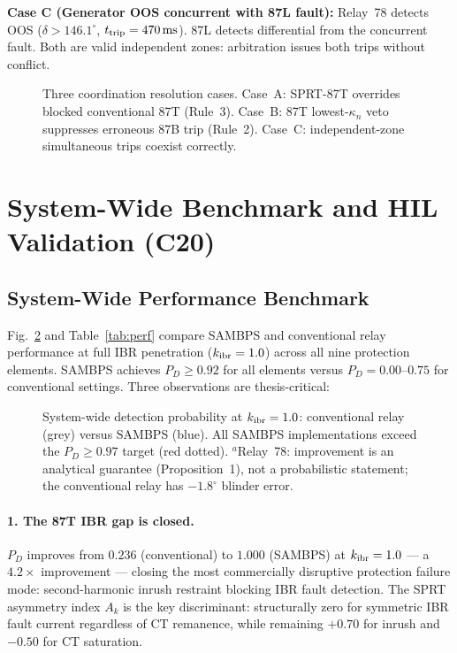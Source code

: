 \documentclass[journal,twoside]{IEEEtran}
\begin{document}
\textbf{Case C (Generator OOS concurrent with 87L fault):}
Relay~78 detects OOS ($\delta > 146.1^\circ$, $t_{\rm trip} = 470\,\text{ms}$).
87L detects differential from the concurrent fault.
Both are valid independent zones: arbitration issues both trips without conflict.

\begin{figure}[t]
  \centering
  \resizebox{\columnwidth}{!}{}
  \caption{Three coordination resolution cases. Case~A: SPRT-87T overrides
    blocked conventional 87T (Rule~3). Case~B: 87T lowest-$\kappa_n$ veto
    suppresses erroneous 87B trip (Rule~2). Case~C: independent-zone
    simultaneous trips coexist correctly.}
  \label{fig:coord_cases}
\end{figure}

\section{System-Wide Benchmark and HIL Validation (C20)}
\label{sec:bench}

\subsection{System-Wide Performance Benchmark}

Fig.~\ref{fig:benchmark} and Table~\ref{tab:perf} compare SAMBPS and conventional
relay performance at full IBR penetration ($k_{\rm ibr} = 1.0$) across all
nine protection elements.
SAMBPS achieves $P_D \geq 0.92$ for all elements versus $P_D = 0.00$--$0.75$
for conventional settings.
Three observations are thesis-critical:

\begin{figure}[t]
  \centering
  
  \caption{System-wide detection probability at $k_{\rm ibr} = 1.0$:
    conventional relay (grey) versus SAMBPS (blue).
    All SAMBPS implementations exceed the $P_D \geq 0.97$ target (red dotted).
    $^a$Relay~78: improvement is an analytical guarantee (Proposition~1),
    not a probabilistic statement; the conventional relay has
    $-1.8^\circ$ blinder error.}
  \label{fig:benchmark}
\end{figure}

\paragraph{1. The 87T IBR gap is closed.}
$P_D$ improves from $0.236$ (conventional) to $1.000$ (SAMBPS) at
$k_{\rm ibr} = 1.0$ --- a $4.2\times$ improvement --- closing the most
commercially disruptive protection failure mode: second-harmonic inrush
restraint blocking IBR fault detection.
The SPRT asymmetry index $A_k$ is the key discriminant: structurally zero for
symmetric IBR fault current regardless of CT remanence, while remaining
$+0.70$ for inrush and $-0.50$ for CT saturation.
\end{document}
